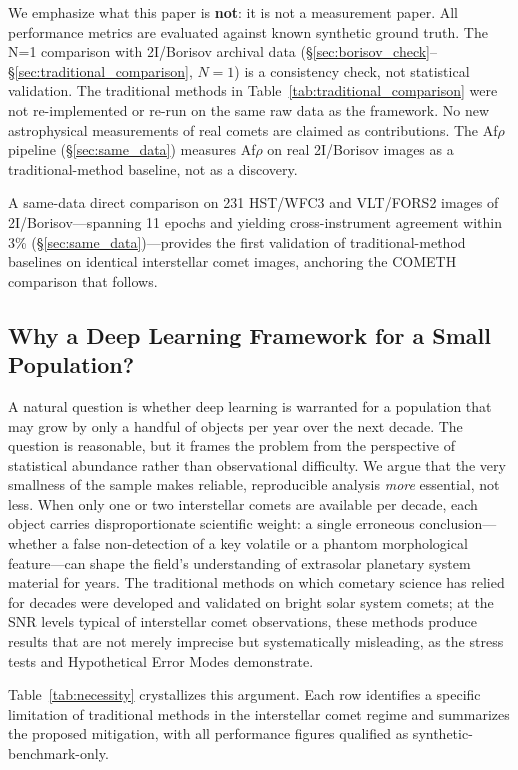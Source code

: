 \documentclass[usenatbib]{mnras}
\begin{document}
We emphasize what this paper is \textbf{not}: it is not a measurement paper. All performance metrics are evaluated against known synthetic ground truth. The N=1 comparison with 2I/Borisov archival data (\S\ref{sec:borisov_check}--\S\ref{sec:traditional_comparison}, $N=1$) is a consistency check, not statistical validation. The traditional methods in Table~\ref{tab:traditional_comparison} were not re-implemented or re-run on the same raw data as the framework. No new astrophysical measurements of real comets are claimed as contributions. The Af$\rho$ pipeline (\S\ref{sec:same_data}) measures Af$\rho$ on real 2I/Borisov images as a traditional-method baseline, not as a discovery.


 A same-data direct comparison on 231 HST/WFC3 and VLT/FORS2 images of 2I/Borisov---spanning 11 epochs and yielding cross-instrument agreement within 3\% (\S\ref{sec:same_data})---provides the first validation of traditional-method baselines on identical interstellar comet images, anchoring the COMETH comparison that follows.

\subsection{Why a Deep Learning Framework for a Small Population?}

A natural question is whether deep learning is warranted for a population that may grow by only a handful of objects per year over the next decade. The question is reasonable, but it frames the problem from the perspective of statistical abundance rather than observational difficulty. We argue that the very smallness of the sample makes reliable, reproducible analysis \textit{more} essential, not less. When only one or two interstellar comets are available per decade, each object carries disproportionate scientific weight: a single erroneous conclusion---whether a false non-detection of a key volatile or a phantom morphological feature---can shape the field's understanding of extrasolar planetary system material for years. The traditional methods on which cometary science has relied for decades were developed and validated on bright solar system comets; at the SNR levels typical of interstellar comet observations, these methods produce results that are not merely imprecise but systematically misleading, as the stress tests and Hypothetical Error Modes demonstrate.

Table~\ref{tab:necessity} crystallizes this argument. Each row identifies a specific limitation of traditional methods in the interstellar comet regime and summarizes the proposed mitigation, with all performance figures qualified as synthetic-benchmark-only.
\end{document}
